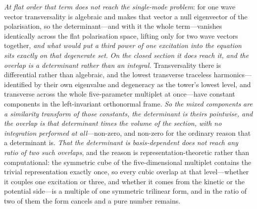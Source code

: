 \documentclass[11pt,a4paper]{article}
\theoremstyle{plain}
\theoremstyle{definition}
\theoremstyle{remark}
\begin{document}
\emph{At flat order that term does not reach the single-mode problem}: for one wave vector transversality is
algebraic and makes that vector a null eigenvector of the polarisation, so the determinant---and with it the
whole term---vanishes identically across the flat polarisation space, lifting only for two wave vectors
together, \emph{and what would put a third power of one excitation into the equation sits exactly on that
degenerate set}. \emph{On the closed section it does reach it, and the overlap is a determinant rather than an
integral.} Transversality there is differential rather than algebraic, and the lowest transverse traceless
harmonics---identified by their own eigenvalue and degeneracy as the tower's lowest level, and transverse across
the whole five-parameter multiplet at once---have constant components in the left-invariant orthonormal frame.
\emph{So the mixed components are a similarity transform of those constants, the determinant is theirs
pointwise, and the overlap is that determinant times the volume of the section, with no integration performed at
all}---non-zero, and non-zero for the ordinary reason that a determinant
is.
\emph{That the determinant is basis-dependent does not reach any ratio of two such overlaps}, and the reason is
representation-theoretic rather than computational: the symmetric cube of the five-dimensional multiplet
contains the trivial representation exactly once, so every cubic overlap at that level---whether it couples one
excitation or three, and whether it comes from the kinetic or the potential side---is a multiple of one
symmetric trilinear form, and in the ratio of two of them the form cancels and a pure number remains.
\end{document}
